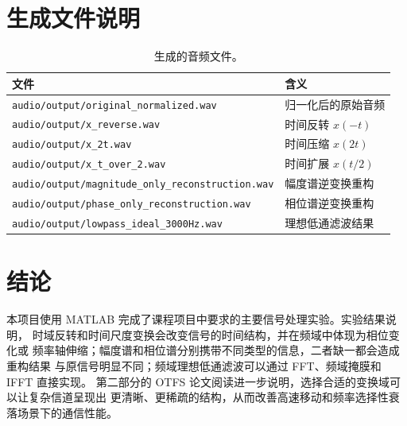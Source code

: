 ﻿\documentclass[11pt,a4paper]{ctexart}
\begin{document}
\section{生成文件说明}

\begin{table}[H]
\centering
\begin{tabular}{ll}
\toprule
文件 & 含义 \\
\midrule
\texttt{audio/output/original\_normalized.wav} & 归一化后的原始音频 \\
\texttt{audio/output/x\_reverse.wav} & 时间反转 $x(-t)$ \\
\texttt{audio/output/x\_2t.wav} & 时间压缩 $x(2t)$ \\
\texttt{audio/output/x\_t\_over\_2.wav} & 时间扩展 $x(t/2)$ \\
\texttt{audio/output/magnitude\_only\_reconstruction.wav} & 幅度谱逆变换重构 \\
\texttt{audio/output/phase\_only\_reconstruction.wav} & 相位谱逆变换重构 \\
\texttt{audio/output/lowpass\_ideal\_3000Hz.wav} & 理想低通滤波结果 \\
\bottomrule
\end{tabular}
\caption{生成的音频文件。}
\end{table}

\section{结论}

本项目使用 MATLAB 完成了课程项目中要求的主要信号处理实验。实验结果说明，
时域反转和时间尺度变换会改变信号的时间结构，并在频域中体现为相位变化或
频率轴伸缩；幅度谱和相位谱分别携带不同类型的信息，二者缺一都会造成重构结果
与原信号明显不同；频域理想低通滤波可以通过 FFT、频域掩膜和 IFFT 直接实现。
第二部分的 OTFS 论文阅读进一步说明，选择合适的变换域可以让复杂信道呈现出
更清晰、更稀疏的结构，从而改善高速移动和频率选择性衰落场景下的通信性能。
\end{document}
